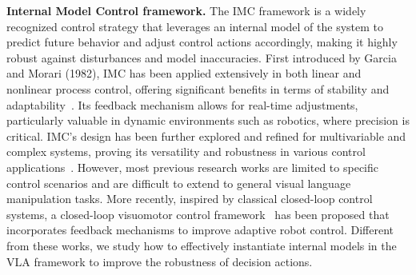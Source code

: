 \noindent\textbf{Internal Model Control framework.} 
The IMC framework is a widely recognized control strategy that leverages an internal model of the system to predict future behavior and adjust control actions accordingly, making it highly robust against disturbances and model inaccuracies. First introduced by Garcia and Morari (1982), IMC has been applied extensively in both linear and nonlinear process control, offering significant benefits in terms of stability and adaptability~\citep{garcia1982internal,rivera1986internal,morari1989robust}. Its feedback mechanism allows for real-time adjustments, particularly valuable in dynamic environments such as robotics, where precision is critical. IMC’s design has been further explored and refined for multivariable and complex systems, proving its versatility and robustness in various control applications~\citep{skogestad2005multivariable}.
However, most previous research works are limited to specific control scenarios and are difficult to extend to general visual language manipulation tasks.
More recently, inspired by classical closed-loop control systems, a closed-loop visuomotor control framework~\citep{bu2024closed} has been proposed that incorporates feedback mechanisms to improve adaptive robot control.
Different from these works, we study how to effectively instantiate internal models in the VLA framework to improve the robustness of decision actions.

